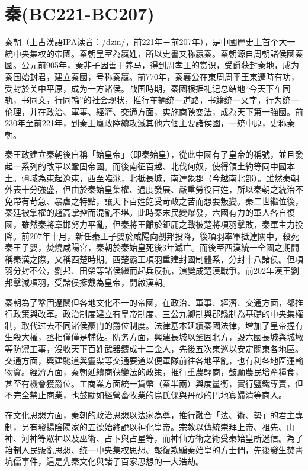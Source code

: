 
\chapter{秦\tiny(BC221-BC207)}

秦朝（上古漢語IPA读音：/dzin/，前221年－前207年），是中國歷史上首个大一統中央集权的帝國。秦朝皇室為嬴姓，所以史書又称嬴秦。秦朝源自周朝諸侯國秦國。公元前905年，秦非子因善于养马，得到周孝王的赏识，受爵获封秦地，成为秦国始封君，建立秦國，号称秦嬴。前770年，秦襄公在東周周平王東遷時有功，受封於关中平原，成为一方诸侯。战国時期，秦國根据礼记总结地“今天下车同轨，书同文，行同輪”的社会现状，推行车辆统一道路，书籍统一文字，行为统一伦理，并在政治、軍事、經濟、交通方面，实施商鞅变法，成為天下第一強國。前230年至前221年，到秦王嬴政陸續攻滅其他六個主要諸侯國，一統中原，史称秦朝。

秦王政建立秦朝後自稱「始皇帝」（即秦始皇），從此中國有了皇帝的稱號，並且發起一系列的改革以鞏固帝國。而後南征百越、北伐匈奴，使得領土約等同中國本土。疆域為東起遼東，西至臨洮，北抵長城，南達象郡（今越南北部）。雖然秦朝外表十分強盛，但由於秦始皇集權、過度發展、嚴重勞役百姓，所以秦朝之統治不免帶有苛急、暴虐之特點，讓天下百姓飽受苛政之苦而想要叛變。秦二世繼位後，秦廷被掌權的趙高掌控而混亂不堪。此時秦末民變爆發，六國有力的軍人各自復國，雖然秦將章邯努力平亂，但秦將王離於鉅鹿之戰被楚將項羽擊敗，秦軍主力投降。前207年十月，新任秦王子嬰於咸陽向劉邦投降，後項羽率軍抵達關中，殺死秦王子嬰，焚燒咸陽宮，秦朝於秦始皇死後3年滅亡。而後至西漢統一全國之期間稱秦漢之際，又稱西楚時期。西楚霸王項羽重建封國制體系，分封十八諸侯。但項羽分封不公，劉邦、田榮等諸侯繼而起兵反抗，演變成楚漢戰爭。前202年漢王劉邦擊滅項羽，受諸侯擁戴為皇帝，開啟漢朝。

秦朝為了鞏固遼闊但各地文化不一的帝國，在政治、軍事、經濟、交通方面，都推行政策與改革。政治制度建立有皇帝制度、三公九卿制與郡縣制為基礎的中央集權制，取代过去不同诸侯豪门的爵位制度。法律基本延續秦國法律，增加了皇帝握有生殺大權，丞相僅僅是輔佐。防务方面，興建長城以鞏固北方，毀六國長城與城墩等防禦工事，沒收天下百姓武器鑄成十二金人，先後五次東巡以安定關東各地區。交通方面，興建馳道與靈渠等交通要道以便軍隊前往各地平亂，也有利各地區運輸物資。經濟方面，秦朝延續商鞅變法的政策，推行重農輕商，鼓勵農民增產糧食，甚至有機會獲爵位。工商業方面統一貨幣（秦半兩）與度量衡，實行鹽鐵專賣，但不完全禁止商業，也鼓勵如經營畜牧業的烏氏倮與丹砂的巴地寡婦清等商人。

在文化思想方面，秦朝的政治思想以法家為尊，推行融合「法、術、勢」的君主專制，另有發揚陰陽家的五德始終說以神化皇帝。宗教以傳統崇拜上帝、祖先、山神、河神等眾神以及巫術、占卜與占星等，而神仙方術之術受秦始皇所迷信。為了箝制人民叛亂思想、统一中央集权思想、報復欺騙秦始皇的方士們，先後發生焚書坑儒事件，這是先秦文化與諸子百家思想的一大浩劫。

